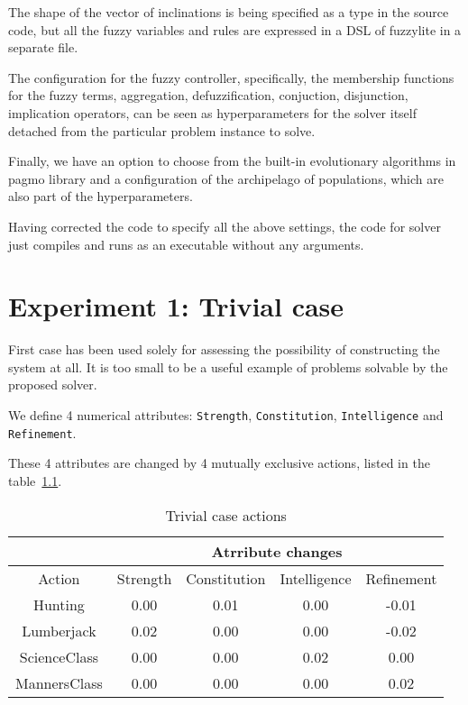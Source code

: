 \documentclass[12pt, a4paper]{report}
\begin{document}
	The shape of the vector of inclinations is being specified as a type in the source code, but all the fuzzy variables and rules are expressed in a DSL of fuzzylite in a separate file.
	
	The configuration for the fuzzy controller, specifically, the membership functions for the fuzzy terms, aggregation, defuzzification, conjuction, disjunction, implication operators, can be seen as hyperparameters for the solver itself detached from the particular problem instance to solve.
	
	Finally, we have an option to choose from the built-in evolutionary algorithms in pagmo library and a configuration of the archipelago of populations, which are also part of the hyperparameters.
	
	Having corrected the code to specify all the above settings, the code for solver just compiles and runs as an executable without any arguments.
	
	\chapter{Experiment 1: Trivial case}\label{trivial-case}

	First case has been used solely for assessing the possibility of constructing the system at all.
	It is too small to be a useful example of problems solvable by the proposed solver.
	
	We define 4 numerical attributes: \texttt{Strength}, \texttt{Constitution}, \texttt{Intelligence} and \texttt{Refinement}.
	
	These 4 attributes are changed by 4 mutually exclusive actions, listed in the table~\ref{table::trivial-case-actions}.
	
\begin{table}[h!]
	\centering
	\caption{Trivial case actions}
	\label{table::trivial-case-actions}
	\begin{tabular}{|c|c|c|c|c|}
		\hline
		              &   \multicolumn{4}{|c|}{Atrribute changes}               \\ \hline
		Action        & Strength & Constitution &  Intelligence  & Refinement   \\ \hline
		Hunting       & 0.00     & 0.01         &  0.00          & -0.01        \\ \hline
		Lumberjack    & 0.02     & 0.00         &  0.00          & -0.02        \\ \hline
		ScienceClass  & 0.00     & 0.00         &  0.02          &  0.00        \\ \hline
		MannersClass  & 0.00     & 0.00         &  0.00          &  0.02        \\ \hline
	\end{tabular}
\end{table}
\end{document}
